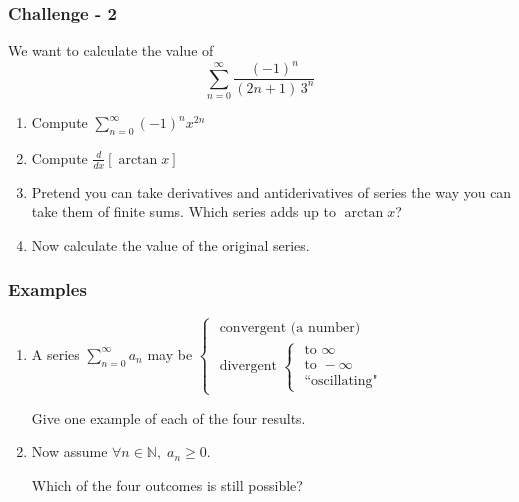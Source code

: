 \begin{frame}[t]
	\fontsize{13}{13}\selectfont
	\frametitle{Challenge - 2}

	We want to calculate the value of
	\[
		\sum_{n=0}^{\infty}\frac{(-1)^{n}}{(2n+1) \, 3^{n}}
	\]

	\hrulefill

	\begin{enumerate}
		\item Compute $\displaystyle \sum_{n=0}^{\infty}(-1)^{n}x^{2n}$

		\item Compute $\displaystyle \frac{d}{dx}\left[ \arctan x \right]$
			\vspace{.2cm}

		\item Pretend you can take derivatives and antiderivatives of series the way
			you can take them of finite sums. Which series adds up to
			$\displaystyle \arctan x$?
			\vspace{.2cm}

		\item Now calculate the value of the original series.
	\end{enumerate}
\end{frame}

\begin{frame}[t]
	\frametitle{Examples}

	\begin{enumerate}
		\item A series $\displaystyle \sum_{n=0}^{\infty}a_{n}$ may be $\displaystyle
			\begin{cases}
				\text{ convergent (a number) }                                                                                  \\
				\text{ divergent } \begin{cases}\text{ to } \infty \\ \text{ to } - \infty \\ \text{ ``oscillating"}\end{cases}
			\end{cases}$
			\vspace{.5cm}

			Give one example of each of the four results.
			\vspace{.5cm}

		\item Now assume $\displaystyle \forall n \in \mathbb{N}, \; a_{n}\geq 0$.

			Which of the four outcomes is still possible?
	\end{enumerate}
\end{frame}

